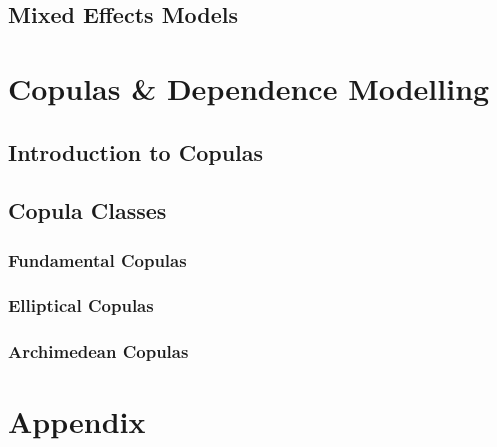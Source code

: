 \documentclass[12pt]{article}
\numberwithin{equation}{section}
\numberwithin{table}{section}
\numberwithin{figure}{section}
\begin{document}
\subsection{Mixed Effects Models} \label{ssec:mixed_models}

%
\clearpage

\section{Copulas \& Dependence Modelling} \label{sec:copulas_and_dependence_moelling}

\subsection{Introduction to Copulas} \label{ssec:intro_to_copulas}

\subsection{Copula Classes} \label{ssec:copula_classes}

\subsubsection{Fundamental Copulas} \label{sssec:fundamental_copulas}

\subsubsection{Elliptical Copulas} \label{sssec:elliptical_copulas}

\subsubsection{Archimedean Copulas} \label{sssec:archimedean_copulas}





\clearpage





%


\section*{Appendix} \label{sec:appendix}

\clearpage
\end{document}
